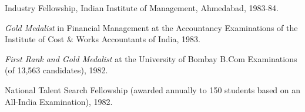 \documentclass{article}
\begin{document}
\begin{description}
\begin{etaremune}
\item Industry Fellowship, Indian Institute of Management, Ahmedabad, 1983-84. 

\item {\it Gold Medalist} in Financial Management at the
Accountancy Examinations of the Institute of
Cost \& Works Accountants of India, 1983. 

\item {\it First Rank and Gold Medalist} at the University of Bombay B.Com 
Examinations (of 13,563 candidates), 1982. 

\item National Talent Search Fellowship (awarded annually to 150
students based on an All-India Examination), 1982. 

\end{etaremune}

\end{description}
\end{document}
